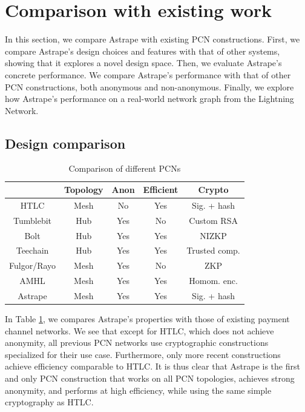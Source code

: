 \documentclass[USenglish,oneside,twocolumn]{article}
\begin{document}
\section{Comparison with existing work} \label{sec:performance}

In this section, we compare Astrape with existing PCN constructions. First, we compare Astrape's design choices and features with that of other systems, showing that it explores a novel design space. Then, we evaluate Astrape's concrete performance. We compare Astrape's performance with that of other PCN constructions, both anonymous and non-anonymous. Finally, we explore how Astrape's performance on a real-world network graph from the Lightning Network.

\subsection{Design comparison}

\begin{table}[h!]
    \caption{Comparison of different PCNs}
    \label{tab:pcncomparison}
    \centering
    \footnotesize
    \begin{tabular}{ccccc}
                    & Topology & Anon & Efficient & Crypto        \\
        \midrule
        HTLC        & Mesh     & No   & Yes       & Sig. + hash   \\
        \midrule
        Tumblebit   & Hub      & Yes  & No        & Custom RSA    \\
        Bolt        & Hub      & Yes  & Yes       & NIZKP         \\
        Teechain    & Hub      & Yes  & Yes       & Trusted comp. \\
        \midrule
        Fulgor/Rayo & Mesh     & Yes  & No        & ZKP           \\
        AMHL        & Mesh     & Yes  & Yes       & Homom. enc.   \\
        \midrule
        Astrape     & Mesh     & Yes  & Yes       & Sig. + hash   \\
    \end{tabular}
\end{table}

In Table \ref{tab:pcncomparison}, we compares Astrape's properties with those of existing payment channel networks. We see that except for HTLC, which does not achieve anonymity, all previous PCN networks use cryptographic constructions specialized for their use case. Furthermore, only more recent constructions achieve efficiency comparable to HTLC. It is thus clear that Astrape is the first and only PCN construction that works on all PCN topologies, achieves strong anonymity, and performs at high efficiency, while using the same simple cryptography as HTLC.
\end{document}
